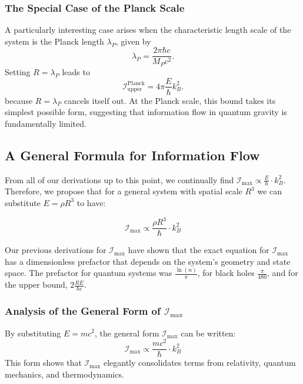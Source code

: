 \documentclass[12pt]{article}
\begin{document}
\subsubsection{The Special Case of the Planck Scale}

A particularly interesting case arises when the characteristic length scale of the system is the Planck length \( \lambda_P \), given by
\begin{equation}
    \lambda_P = \frac{2\pi \hbar c}{M_P c^2}.
\end{equation}
Setting \( R = \lambda_P \) leads to
\begin{equation}
    \mathcal{I}_{\text{upper}}^{\text{Planck}} = 4\pi \frac{E}{\hbar} k_B^2.
\end{equation}
because \( R = \lambda_P \) cancels itself out. At the Planck scale, this bound takes its simplest possible form, suggesting that information flow in quantum gravity is fundamentally limited.

\subsection{A General Formula for Information Flow}

From all of our derivations up to this point, we continually find \(\mathcal{I}_{\max} \propto \frac{E}{\hbar} \cdot k_B^2\). Therefore, we propose that for a general system with spatial scale $R^3$ we can substitute $E = \rho R^3$ to have:

\begin{equation}
    \mathcal{I}_{\max} \propto \frac{\rho R^3}{\hbar} \cdot k_B^2
\end{equation}

Our previous derivations for $\mathcal{I}_{\max}$ have shown that the exact equation for $\mathcal{I}_{\max}$ has a dimensionless prefactor that depends on the system's geometry and state space. The prefactor for quantum systems was $\frac{\ln(n)}{\pi}$, for black holes $\frac{\pi}{480}$, and for the upper bound, $2 \frac{RE}{\hbar c}$.

\subsubsection{Analysis of the General Form of $\mathcal{I}_{\max}$}

By substituting $E = mc^2$, the general form \(\mathcal{I}_{\max}\) can be written:
\begin{equation}
    \mathcal{I}_{\max} \propto \frac{mc^2}{\hbar} \cdot k_B^2
\end{equation}
This form shows that \(\mathcal{I}_{\max}\) elegantly consolidates terms from relativity, quantum mechanics, and thermodynamics.
\end{document}
